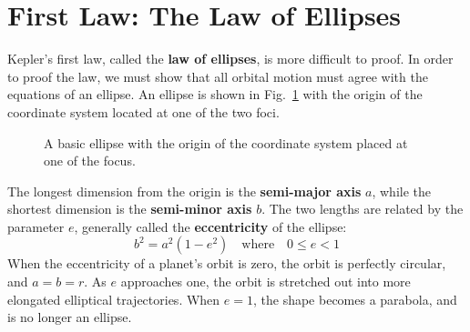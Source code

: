 \documentclass[11pt]{article}
\begin{document}
\section{First Law: The Law of Ellipses}
Kepler's first law, called the \textbf{law of ellipses}, is more difficult to
proof. In order to proof the
law, we must show that all orbital motion must agree with the equations of an
ellipse. An ellipse is shown in Fig.~\ref{ellipse1} with the origin of the
coordinate system located at one of the two foci.
\begin{figure}[!ht]
  \centering
  \caption{A basic ellipse with the origin of the coordinate system placed at
    one of the focus.}
  \label{ellipse1}
\end{figure}

The longest dimension from the origin is the \textbf{semi-major axis} $a$, while
the shortest dimension is the \textbf{semi-minor axis} $b$. The two lengths are
related by the parameter $e$, generally called the \textbf{eccentricity} of the
ellipse:
\begin{equation}
  b^2=a^2(1-e^2)\quad\text{where}\quad 0\leq e < 1
\end{equation}
When the eccentricity of a planet's orbit is zero, the orbit is perfectly
circular, and $a=b=r$. As $e$ approaches one, the orbit is stretched out into
more elongated elliptical trajectories.
When $e=1$, the shape becomes a parabola, and is no longer an ellipse.
\end{document}
